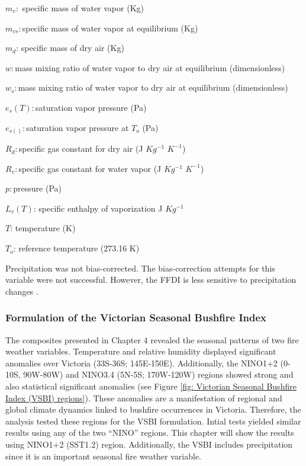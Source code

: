 $m_{v}:$ specific mass of water vapor (Kg)

$m_{vs}:$specific mass of water vapor at equilibrium (Kg)

$m_{d}$: specific mass of dry air (Kg)

$w:$mass mixing ratio of water vapor to dry air at equilibrium (dimensionless)

$w_{s}:$mass mixing ratio of water vapor to dry air at equilibrium
(dimensionless)

$e_{s}(T):$saturation vapor pressure (Pa)

$e_{s()}:$saturation vapor pressure at $T_{o}$ (Pa)

$R_{d}:$specific gas constant for dry air (J $Kg^{-1}$ $K^{-1}$)

$R_{v}:$specific gas constant for water vapor (J $Kg^{-1}$ $K^{-1}$)

$p:$pressure (Pa)

$L_{v}(T)$: specific enthalpy of vaporization J $Kg^{-1}$

$T$: temperature (K)

$T_{o}$: reference temperature (273.16 K)

Precipitation was not bias-corrected. The bias-correction attempts
for this variable were not successful. However, the FFDI is less sensitive
to precipitation changes \citep{Dowdy2009}. 


\subsubsection{Formulation of the Victorian Seasonal Bushfire Index \label{sub:Formulation-VSBI}}

The composites presented in Chapter 4 revealed the seasonal patterns
of two fire weather variables. Temperature and relative humidity displayed
significant anomalies over Victoria (33S-36S; 145E-150E). Additionally,
the NINO1+2 (0-10S, 90W-80W) and NINO3.4 (5N-5S; 170W-120W) regions
showed strong and also statistical significant anomalies (see Figure
\ref{fig: Victorian Seasonal Bushfire Index (VSBI) regions}). These
anomalies are a manifestation of regional and global climate dynamics
linked to bushfire occurrences in Victoria. Therefore, the analysis
tested these regions for the VSBI formulation. Intial tests yielded
similar results using any of the two ``NINO'' regions. This chapter
will show the results using NINO1+2 (SST1.2) region. Additionally,
the VSBI includes precipitation since it is an important seasonal
fire weather variable.


